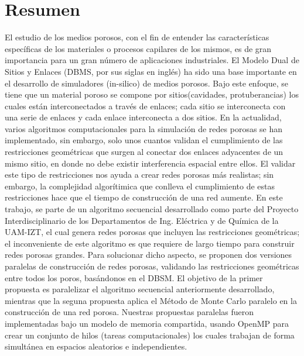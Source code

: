 \chapter{Resumen}
\bigskip
\barra
\bigskip
\thispagestyle{empty}
El estudio de los medios porosos, con el fin de entender las caracter\'isticas espec\'ificas de los materiales o procesos capilares de los mismos, es de gran importancia para un gran n\'umero de aplicaciones industriales. El Modelo Dual de Sitios y Enlaces (DBMS, por sus siglas en ingl\'es) ha sido una base importante en el desarrollo de simuladores (in-silico) de medios porosos. Bajo este enfoque, se tiene que un material poroso se compone por sitios(cavidades, protuberancias) los cuales est\'an interconectados a trav\'es de enlaces; cada sitio se interconecta con una serie de enlaces y cada enlace interconecta a dos sitios. En la actualidad, varios algoritmos computacionales para la simulaci\'on de redes porosas se han implementado, sin embargo, solo unos cuantos validan el cumplimiento de las restricciones geom\'etricas que surgen al conectar dos enlaces adyacentes de un mismo sitio, en donde no debe existir interferencia espacial entre ellos. El validar este tipo de restricciones nos ayuda a crear redes porosas m\'as realistas; sin embargo, la complejidad algor\'itimica que conlleva el cumplimiento de estas restricciones hace que el tiempo de construcci\'on de una red aumente. En este trabajo, se parte de un algoritmo secuencial desarrollado como parte del Proyecto Interdisciplinario de los Departamentos de Ing. El\'ectrica y de Qu\'imica de la UAM-IZT, el cual genera redes porosas que incluyen las restricciones geom\'etricas; el inconveniente de este algoritmo es que requiere de largo tiempo para construir redes porosas grandes. Para solucionar dicho aspecto, se proponen dos versiones paralelas de construcci\'on de redes porosas, validando las restricciones geom\'etricas entre todos los poros, bas\'andonos en el DBSM. El objetivo de la primer propuesta es paralelizar el algoritmo secuencial anteriormente desarrollado, mientras que la seguna propuesta aplica el M\'etodo de Monte Carlo paralelo en la construcci\'on de una red porosa.  Nuestras propuestas paralelas fueron implementadas bajo un modelo de memoria compartida, usando OpenMP para crear un conjunto de hilos (tareas computacionales) los cuales trabajan de forma simult\'anea en espacios aleatorios e independientes.

